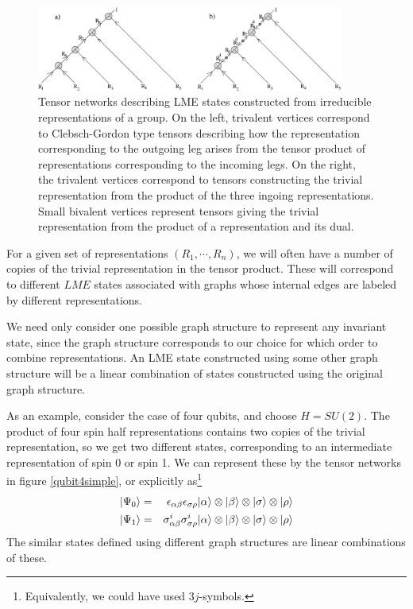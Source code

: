 \documentclass[12pt]{article}
\theoremstyle{definition}
\newcommand{\bea}{\begin{eqnarray}}
\newcommand{\eea}{\end{eqnarray}}
\begin{document}
\begin{figure}
\centering
\includegraphics[width=0.9\textwidth]{tensorBoth.eps}
\caption{Tensor networks describing LME states constructed from irreducible representations of a group. On the left, trivalent vertices correspond to Clebsch-Gordon type tensors describing how the representation corresponding to the outgoing leg arises from the tensor product of representations corresponding to the incoming legs. On the right, the trivalent vertices correspond to tensors constructing the trivial representation from the product of the three ingoing representations. Small bivalent vertices represent tensors giving the trivial representation from the product of a representation and its dual.}
\label{tensorBoth}
\end{figure}

For a given set of representations $(R_1, \cdots, R_n)$, we will often have a number of copies of the trivial representation in the tensor product. These will correspond to different $LME$ states associated with graphs whose internal edges are labeled by different representations.

We need only consider one possible graph structure to represent any invariant state, since the graph structure corresponds to our choice for which order to combine representations. An LME state constructed using some other graph structure will be a linear combination of states constructed using the original graph structure.

As an example, consider the case of four qubits, and choose $H = SU(2)$. The product of four spin half representations contains two copies of the trivial representation, so we get two different states, corresponding to an intermediate representation of spin 0 or spin 1. We can represent these by the tensor networks in figure \ref{qubit4simple}, or explicitly as\footnote{Equivalently, we could have used $3j$-symbols.}
\bea
|\Psi_0 \rangle &=& \epsilon_{\alpha \beta} \epsilon_{\sigma \rho} | \alpha \rangle \otimes |\beta \rangle \otimes |\sigma \rangle \otimes |\rho \rangle \cr
|\Psi_1 \rangle &=& \sigma^i_{\alpha \beta} \sigma^i_{\sigma \rho} | \alpha \rangle \otimes |\beta \rangle \otimes |\sigma \rangle \otimes |\rho \rangle
\eea
The similar states defined using different graph structures are linear combinations of these.
\end{document}
